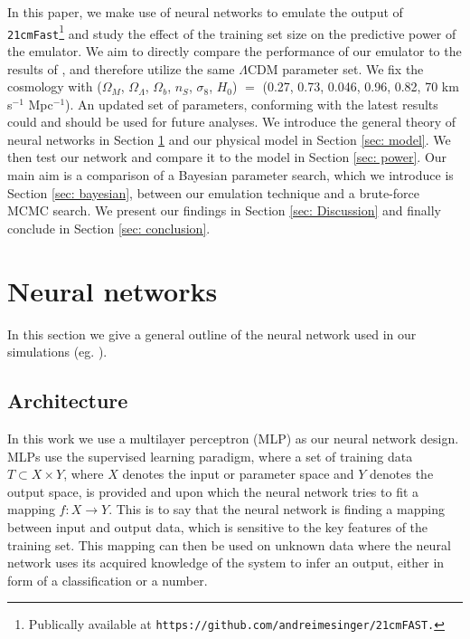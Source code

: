 \documentclass[useAMS,usenatbib]{mnras}
\begin{document}
In this paper, we make use of neural networks to emulate the output of \texttt{21cmFast}\footnote{Publically available at \newline \texttt{https://github.com/andreimesinger/21cmFAST.}} and study the effect of the training set size on the predictive power of the emulator.
We aim to directly compare the performance of our emulator to the results of \citet{greig2015}, and therefore utilize the same $\Lambda$CDM parameter set. 
We fix the cosmology with ($\Omega_M$, $\Omega_\Lambda$, $\Omega_b$, $n_S$, $\sigma_8$, $H_0$) $=$ (0.27, 0.73, 0.046, 0.96, 0.82, 70 km s$^{-1}$ Mpc$^{-1}$).
An updated set of parameters, conforming with the latest \citet{PlanckCollaboration2015r_13} results could and should be used for future analyses. 
We introduce the general theory of neural networks in Section \ref{sec: neural} and our physical model in Section \ref{sec: model}. 
We then test our network and compare it to the model in Section \ref{sec: power}. 
Our main aim is a comparison of a Bayesian parameter search, which we introduce is Section \ref{sec: bayesian}, between our emulation technique and a brute-force MCMC search. 
We present our findings in Section \ref{sec: Discussion} and finally conclude in Section \ref{sec: conclusion}.

\section{Neural networks} 
\label{sec: neural}
In this section we give a general outline of the neural network used in our simulations (eg. \cite{Cheng1994}).
 
\subsection{Architecture}\label{sec: architecture}
In this work we use a multilayer perceptron (MLP) as our neural network design. 
MLPs use the supervised learning paradigm, where a set of training data $T \subset X \times Y$, where $X$ denotes the input or parameter space and $Y$ denotes the output space, is provided and upon which the neural network tries to fit a mapping $f: X\rightarrow Y$.
This is to say that the neural network is finding a mapping between input and output data, which is sensitive to the key features of the training set. 
This mapping can then be used on unknown data where the neural network uses its acquired knowledge of the system to infer an output, either in form of a classification or a number.
\end{document}
